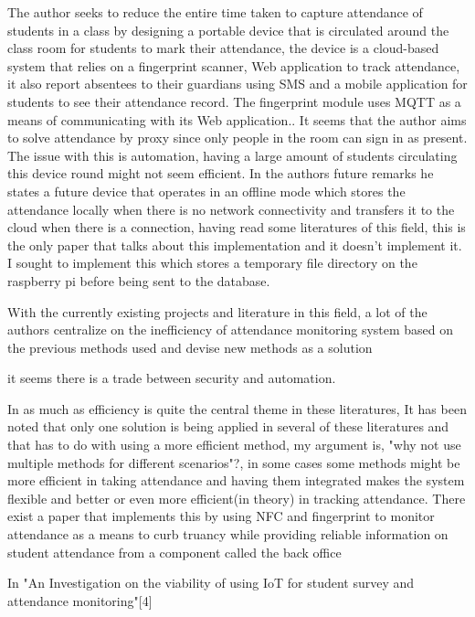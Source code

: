 The author seeks to reduce the entire time taken to capture attendance of students in a class by designing a portable device that is circulated around the class room for students to mark their attendance, the device is a cloud-based system that relies on a fingerprint scanner, Web application to track attendance, it also report absentees to their guardians using SMS and a mobile application for students to see their attendance record. The fingerprint module uses MQTT as a means of communicating with its Web application.\cite{Rachna}. It seems that the author aims to solve attendance by proxy since only people in the room can sign in as present. The issue with this is automation, having a large amount of students circulating this device round might not seem efficient. In the authors future remarks he states a future device that operates in an offline mode which stores the attendance locally when there is no network connectivity and transfers it to the cloud when there is a connection, having read some literatures of this field, this is the only paper that talks about this implementation and it doesn't implement it. I sought to implement this which stores a temporary file directory on the raspberry pi before being sent to the database.

With the currently existing projects and literature in this field, a lot of the authors centralize on the inefficiency of attendance monitoring system based on the previous methods used and devise new methods as a solution\cite{soe2018implementation, Rachna, Bhagat2020, Www2012, KaziARP, Tt2021}

it seems there is a trade between security and automation.

In as much as efficiency is quite the central theme in these literatures, It has been noted that only one solution is being applied in several of these literatures and that has to do with using a more efficient method, my argument is, "why not use multiple methods for different scenarios"?, in some cases some methods might be more efficient in taking attendance and having them integrated makes the system flexible and better or even more efficient(in theory) in tracking attendance. There exist a paper that implements this by using NFC and fingerprint to monitor attendance as a means to curb truancy while providing reliable information on student attendance from a component called the back office

In "An Investigation on the viability of using IoT for student survey and attendance monitoring"[4]



